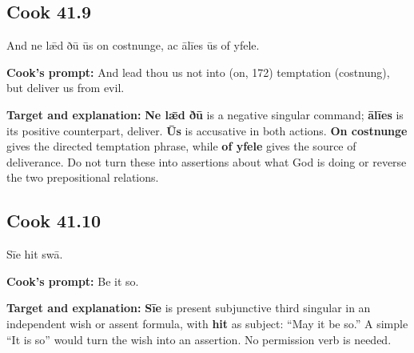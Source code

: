 \par\begin{minipage}{\linewidth}\raggedright
\subsection*{Cook 41.9}

And ne lǣd ðū ūs on costnunge, ac ālīes ūs of yfele.

\textbf{Cook's prompt:} And lead thou us not into (on, 172) temptation (costnung), but deliver us from evil.

\textbf{Target and explanation:} \textbf{Ne lǣd ðū} is a negative singular command; \textbf{ālīes} is its positive counterpart, deliver. \textbf{Ūs} is accusative in both actions. \textbf{On costnunge} gives the directed temptation phrase, while \textbf{of yfele} gives the source of deliverance. Do not turn these into assertions about what God is doing or reverse the two prepositional relations.

\end{minipage}\par\addvspace{4pt}

\par\begin{minipage}{\linewidth}\raggedright
\subsection*{Cook 41.10}

Sīe hit swā.

\textbf{Cook's prompt:} Be it so.

\textbf{Target and explanation:} \textbf{Sīe} is present subjunctive third singular in an independent wish or assent formula, with \textbf{hit} as subject: “May it be so.” A simple “It is so” would turn the wish into an assertion. No permission verb is needed.

\end{minipage}\par\addvspace{4pt}

